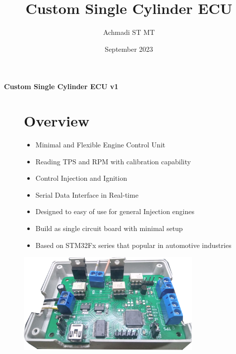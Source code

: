 \documentclass[a4paper,12pt,oneside,pdflatex,italian,final,twocolumn]{article}
\title{Custom Single Cylinder ECU}
\author{Achmadi ST MT}
\date{September 2023}
\begin{document}
	\pagestyle{fancy}
	
	\chead{\today}
	
	\onecolumn
	\begin{figure}
		
	\end{figure}\begin{minipage}{0.47\textwidth}
		\centering
		
	\end{minipage}
	\hfill
	\begin{minipage}{0.47\textwidth}
		\raggedleft
		\Huge \textbf{Custom Single Cylinder ECU v1}
	\end{minipage}

	\begin{figure}
		\begin{minipage}{0.47\textwidth}
			
			\section{Overview}
			\begin{itemize}
				\item Minimal and Flexible Engine Control Unit
				\item Reading TPS and RPM with calibration capability
				\item Control Injection and Ignition 
				\item Serial Data Interface in Real-time
				\item Designed to easy of use for general Injection engines
				\item Build as single circuit board with minimal setup
				\item Based on STM32Fx series that popular in automotive industries
			\end{itemize}
			
		\end{minipage}
		\hfill
		\begin{minipage}{0.47\textwidth}
			\centering
			\includegraphics[width=0.8\textwidth,right]{images/unit.png}
		\end{minipage}
	\end{figure}
\end{document}
